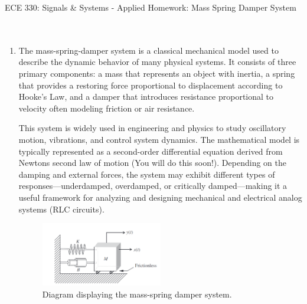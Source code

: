 \documentclass[12pt]{article}
\begin{document}
\begin{center}
{\large ECE 330: Signals \& Systems  -  Applied Homework: Mass Spring Damper System}
\mbox{ }\\
\mbox{ }\\
\end{center}




\begin{enumerate}[\qquad 1)]

    \item 

The mass-spring-damper system is a classical mechanical model used to describe the dynamic behavior of many physical systems. It consists of three primary components: a mass that represents an object with inertia, a spring that provides a restoring force proportional to displacement according to Hooke's Law, and a damper that introduces resistance proportional to velocity often modeling friction or air resistance.

This system is widely used in engineering and physics to study oscillatory motion, vibrations, and control system dynamics. The mathematical model is typically represented as a second-order differential equation derived from Newtons second law of motion (You will do this soon!). Depending on the damping and external forces, the system may exhibit different types of responses—underdamped, overdamped, or critically damped—making it a useful framework for analyzing and designing mechanical and electrical analog systems (RLC circuits).

\begin{figure}[htbp]
    \centering
    \includegraphics[width=0.5\textwidth]{images/msd_figure.png}
    \caption{Diagram displaying the mass-spring damper system.}
\end{figure}


\end{enumerate}
\end{document}
